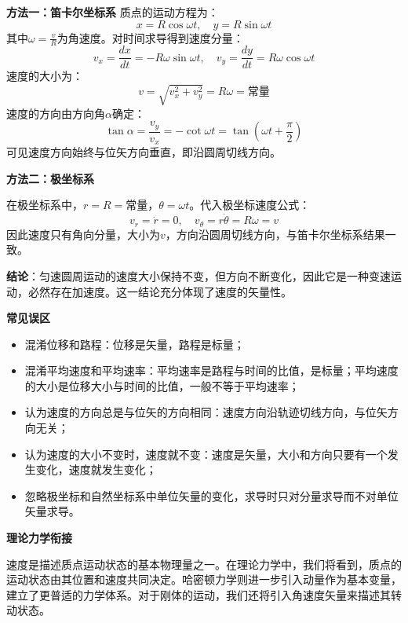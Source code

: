 \textbf{方法一：笛卡尔坐标系}
质点的运动方程为：
\[
x = R\cos\omega t, \quad y = R\sin\omega t
\]
其中$\omega=\frac{v}{R}$为角速度。对时间求导得到速度分量：
\[
v_x = \frac{dx}{dt} = -R\omega\sin\omega t, \quad v_y = \frac{dy}{dt} = R\omega\cos\omega t
\]
速度的大小为：
\[
v = \sqrt{v_x^2 + v_y^2} = R\omega = \text{常量}
\]
速度的方向由方向角$\alpha$确定：
\[
\tan\alpha = \frac{v_y}{v_x} = -\cot\omega t = \tan\left(\omega t + \frac{\pi}{2}\right)
\]
可见速度方向始终与位矢方向垂直，即沿圆周切线方向。

\textbf{方法二：极坐标系}

在极坐标系中，$r=R=\text{常量}$，$\theta=\omega t$。代入极坐标速度公式：
\[
v_r = \dot{r} = 0, \quad v_\theta = r\dot{\theta} = R\omega = v
\]
因此速度只有角向分量，大小为$v$，方向沿圆周切线方向，与笛卡尔坐标系结果一致。

\textbf{结论}：匀速圆周运动的速度大小保持不变，但方向不断变化，因此它是一种变速运动，必然存在加速度。这一结论充分体现了速度的矢量性。

\textbf{常见误区}
\begin{itemize}
\item 混淆位移和路程：位移是矢量，路程是标量；
\item 混淆平均速度和平均速率：平均速率是路程与时间的比值，是标量；平均速度的大小是位移大小与时间的比值，一般不等于平均速率；
\item 认为速度的方向总是与位矢的方向相同：速度方向沿轨迹切线方向，与位矢方向无关；
\item 认为速度的大小不变时，速度就不变：速度是矢量，大小和方向只要有一个发生变化，速度就发生变化；
\item 忽略极坐标和自然坐标系中单位矢量的变化，求导时只对分量求导而不对单位矢量求导。
\end{itemize}

\textbf{理论力学衔接}

速度是描述质点运动状态的基本物理量之一。在理论力学中，我们将看到，质点的运动状态由其位置和速度共同决定。哈密顿力学则进一步引入动量作为基本变量，建立了更普适的力学体系。对于刚体的运动，我们还将引入角速度矢量来描述其转动状态。